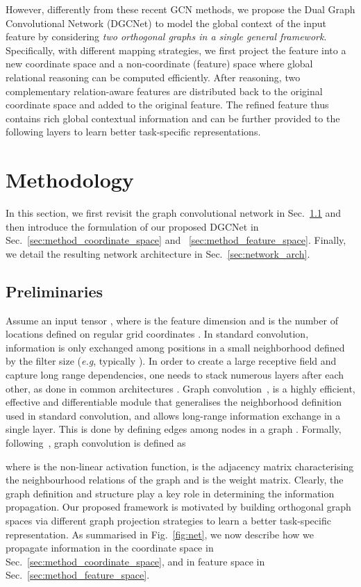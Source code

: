 \documentclass{bmvc2k}
\def\eg{\emph{e.g}\bmvaOneDot}
\begin{document}
However, differently from these recent GCN methods, we propose the Dual Graph Convolutional Network (DGCNet) to model the global context of the input feature by considering \emph{two orthogonal graphs in a single general framework}.
Specifically, with different mapping strategies, we first project the feature into a new coordinate space and a non-coordinate (feature) space where global relational reasoning can be computed efficiently.
After reasoning, two complementary relation-aware features are distributed back to the original coordinate space and added to the original feature. The refined feature thus contains rich global contextual information and can be further provided to the following layers to learn better task-specific representations.
 \section{Methodology}
In this section, we first revisit the graph convolutional network in Sec.~\ref{sec:method_prelim} and then introduce the formulation of our proposed DGCNet in Sec.~\ref{sec:method_coordinate_space} and ~\ref{sec:method_feature_space}.
Finally, we detail the resulting network architecture in Sec.~\ref{sec:network_arch}.


\subsection{Preliminaries}
\label{sec:method_prelim}
Assume an input tensor , where  is the feature dimension and  is the number of locations defined on regular grid coordinates .  
In standard convolution, information is only exchanged among positions in a small neighborhood defined by the filter size (\eg, typically ). 
In order to create a large receptive field and capture long range dependencies, one needs to stack numerous layers after each other, as done in common architectures \cite{vgg,resnet}.
Graph convolution~\cite{gcnpaper}, is a highly efficient, effective and differentiable module that generalises the neighborhood definition used in standard convolution, and allows long-range information exchange in a single layer.
This is done by defining edges  among nodes  in a graph . 
Formally, following~\cite{gcnpaper}, graph convolution is defined as

where  is the non-linear activation function,  is the adjacency matrix characterising the neighbourhood relations of the graph and   is the weight matrix. 
Clearly, the graph definition and structure play a key role in determining the information propagation.
Our proposed framework is motivated by building orthogonal graph spaces via different graph projection strategies to learn a better task-specific representation.
As summarised in Fig.~\ref{fig:net}, we now describe how we propagate information in the coordinate space in Sec.~\ref{sec:method_coordinate_space}, and in feature space in Sec.~\ref{sec:method_feature_space}.
\end{document}
